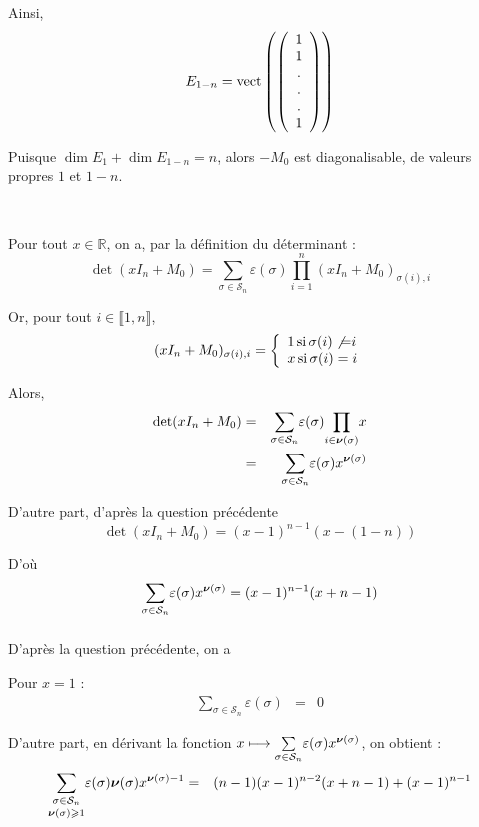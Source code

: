 Ainsi,
\[ E_{1 - n} = \operatorname{vect} \left( \left( \begin{array}{c}
     1\\
     1\\
     .\\
     .\\
     .\\
     1
   \end{array} \right) \right) \]


Puisque $\dim E_1 + \dim E_{1 - n} = n$, alors $- M_0$ est diagonalisable, de
valeurs propres $1$ et $1 - n$.

\

 Pour tout $x \in \mathbb{R}$, on a, par la d{\'e}finition du
d{\'e}terminant :
\[ \det (x I_n + M_0) = \underset{\sigma \in \mathcal{S}_n}{\sum} \varepsilon
   (\sigma) \underset{i = 1}{\overset{n}{\prod}} (x I_n + M_0)_{\sigma (i), i}
\]


Or, pour tout $i \in \llbracket 1, n \rrbracket$,
\[ (x I_n + M_0)_{\sigma (i), i} = \left\{\begin{array}{l}
     1 \operatorname{si} \sigma (i) \not{=} i\\
     x \operatorname{si} \sigma (i) = i
   \end{array}\right. \]


Alors,
\begin{eqnarray*}
  \det (x I_n + M_0) & = & \underset{\sigma \in \mathcal{S}_n}{\sum}
  \varepsilon (\sigma) \underset{i \in \boldsymbol{\nu} (\sigma)}{\prod} x\\
  & = & \underset{\sigma \in \mathcal{S}_n}{\sum} \varepsilon (\sigma)
  x^{\boldsymbol{\nu} (\sigma)}
\end{eqnarray*}


D'autre part, d'apr{\`e}s la question pr{\'e}c{\'e}dente
\[ \det (x I_n + M_0) = (x - 1)^{n - 1} (x - (1 - n)) \]


D'o{\`u}
\[ \underset{\sigma \in \mathcal{S}_n}{\sum} \varepsilon (\sigma)
   x^{\boldsymbol{\nu} (\sigma)} = (x - 1)^{n - 1} (x + n - 1) \]
\[ \  \]


 D'apr{\`e}s la question pr{\'e}c{\'e}dente, on a

Pour $x = 1$ :
\begin{eqnarray*}
  \underset{\sigma \in \mathcal{S}_n}{\sum} \varepsilon (\sigma) & = & 0
\end{eqnarray*}


D'autre part, en d{\'e}rivant la fonction $x \longmapsto \underset{\sigma \in
\mathcal{S}_n}{\sum} \varepsilon (\sigma) x^{\boldsymbol{\nu} (\sigma)}$, on
obtient :
\begin{eqnarray*}
  \underset{\boldsymbol{\nu} (\sigma) \geqslant 1}{\underset{\sigma \in
  \mathcal{S}_n}{\sum}} \varepsilon (\sigma) \boldsymbol{\nu} (\sigma)
  x^{\boldsymbol{\nu} (\sigma) - 1} & = & (n - 1) (x - 1)^{n - 2} (x + n - 1) +
  (x - 1)^{n - 1}
\end{eqnarray*}


